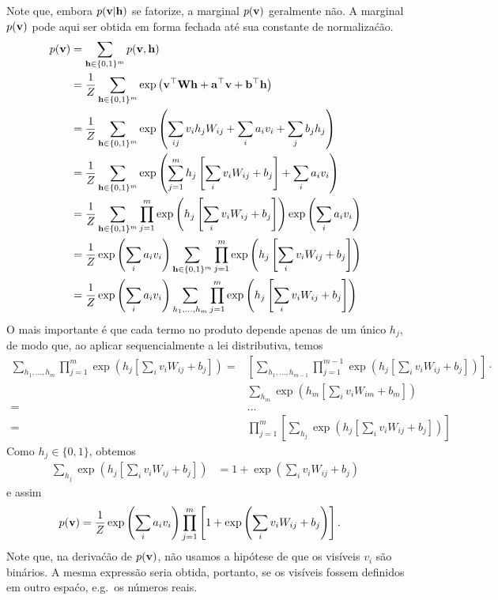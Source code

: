 \begin{exenumerate}
\begin{solution}
        Note que, embora $p(\mathbf{v} | \mathbf{h})$ se fatorize, a marginal $p(\mathbf{v})$
        geralmente n\~ao. A marginal $p(\mathbf{v})$ pode aqui ser obtida em
        forma fechada at\'e sua constante de normaliza\'c\~ao.
        \begin{align}
            p(\mathbf{v}) & = \sum_{\mathbf{h} \in \{0,1\}^m} p(\mathbf{v},\mathbf{h}) \\
            & = \frac{1}{Z} \sum_{\mathbf{h} \in \{0,1\}^m} \exp\left( \mathbf{v}^\top \mathbf{W} \mathbf{h} + \mathbf{a}^\top\mathbf{v} + \mathbf{b}^\top\mathbf{h} \right)\\
            & =  \frac{1}{Z}  \sum_{\mathbf{h} \in \{0,1\}^m} \exp\left( \sum_{ij} v_i h_j W_{ij} + \sum_i a_i v_i + \sum_j b_j h_j \right)\\
            & =  \frac{1}{Z}  \sum_{\mathbf{h} \in \{0,1\}^m} \exp\left( \sum_{j=1}^m h_j \left[\sum_i v_i W_{ij} + b_j\right] + \sum_i a_i v_i \right)\\
            & =  \frac{1}{Z}  \sum_{\mathbf{h} \in \{0,1\}^m} \prod_{j=1}^m \exp\left( h_j \left[\sum_i v_i W_{ij} + b_j\right] \right) \exp\left( \sum_i a_i v_i \right)\\
            & =  \frac{1}{Z} \exp\left( \sum_i a_i v_i \right) \sum_{\mathbf{h} \in \{0,1\}^m} \prod_{j=1}^m \exp\left( h_j \left[\sum_i v_i W_{ij} + b_j\right] \right) \\
            & =  \frac{1}{Z} \exp\left( \sum_i a_i v_i \right) \sum_{h_1, \ldots, h_m} \prod_{j=1}^m  \exp\left( h_j \left[\sum_i v_i W_{ij} + b_j\right] \right)
        \end{align}
        O mais importante \'e que cada termo no produto depende apenas de um \'unico $h_j$, de modo que, ao aplicar sequencialmente a lei distributiva, temos
        \begin{align}
            \sum_{h_1, \ldots, h_m} \prod_{j=1}^m  \exp\left( h_j \left[\sum_i v_i W_{ij} + b_j\right] \right)  =& \left[ \sum_{h_1, \ldots, h_{m-1}} \prod_{j=1}^{m-1}  \exp\left( h_j \left[\sum_i v_i W_{ij} + b_j\right] \right)\right] \cdot \nonumber \\
            &\sum_{h_m} \exp\left( h_m \left[\sum_i v_i W_{im} + b_m\right] \right)\\
            =& \ldots \nonumber \\
            =& \prod_{j=1}^m \left[\sum_{h_j} \exp\left( h_j \left[\sum_i v_i W_{ij} + b_j\right] \right)\right]
        \end{align}
        Como $h_j \in \{0,1\}$, obtemos
        \begin{align}
            \sum_{h_j} \exp\left( h_j \left[\sum_i v_i W_{ij} + b_j\right] \right) & = 1+ \exp\left(\sum_i v_i W_{ij} + b_j \right)
        \end{align}
        e assim
        \begin{align}
            p(\mathbf{v}) & = \frac{1}{Z}  \exp\left( \sum_i a_i v_i \right) \prod_{j=1}^m \left[1+ \exp\left(\sum_i v_i W_{ij} + b_j \right)\right].
        \end{align}
        Note que, na deriva\'c\~ao de $p(\mathbf{v})$, n\~ao usamos a
        hip\'otese de que os vis\'iveis $v_i$ s\~ao bin\'arios. A mesma
        express\~ao seria obtida, portanto, se os vis\'iveis fossem definidos em
        outro espa\'co, e.g.\ os n\'umeros reais.
        

\end{solution}
\end{exenumerate}
